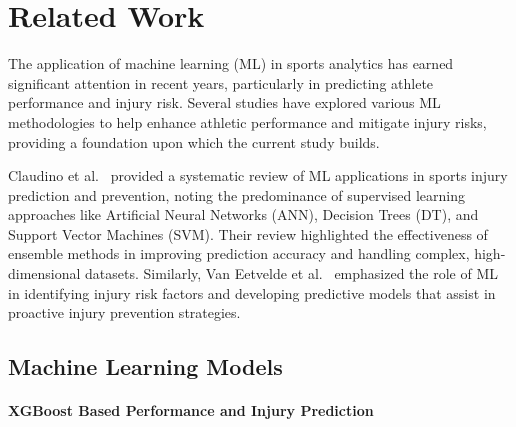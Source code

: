 \documentclass[manuscript,acmsmall,review,screen,authorversion=true]{acmart}
\begin{document}
\section{Related Work}
The application of machine learning (ML) in sports analytics has earned significant attention in recent years, particularly in predicting athlete performance and injury risk. Several studies have explored various ML methodologies to help enhance athletic performance and mitigate injury risks, providing a foundation upon which the current study builds.

Claudino et al.~\cite{claudino2019} provided a systematic review of ML applications in sports injury prediction and prevention, noting the predominance of supervised learning approaches like Artificial Neural Networks (ANN), Decision Trees (DT), and Support Vector Machines (SVM). Their review highlighted the effectiveness of ensemble methods in improving prediction accuracy and handling complex, high-dimensional datasets. Similarly, Van Eetvelde et al.~\cite{van2021} emphasized the role of ML in identifying injury risk factors and developing predictive models that assist in proactive injury prevention strategies. 

\subsection{Machine Learning Models}
  
\paragraph{XGBoost Based Performance and Injury Prediction} 
\end{document}
